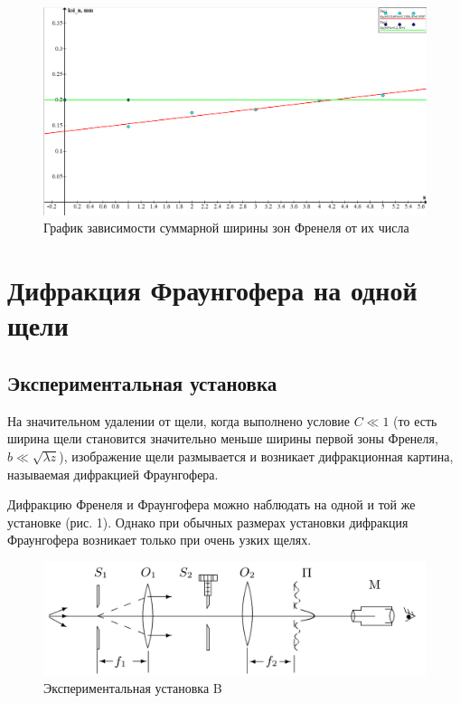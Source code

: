 \begin{figure}[h!]
	\label{graf_a}
	\includegraphics[scale=0.47]{pics/graph1.png}
	\caption{График зависимости суммарной ширины зон Френеля от их числа}
\end{figure}



\section{Дифракция Фраунгофера на одной щели}

	\subsection{Экспериментальная установка}
	
	На значительном удалении от щели, когда выполнено условие $ C \ll 1 $
(то есть ширина щели становится значительно меньше ширины первой
зоны Френеля, $ b \ll \sqrt{\lambda z} $), изображение щели размывается и возникает
дифракционная картина, называемая дифракцией Фраунгофера.

Дифракцию Френеля и Фраунгофера можно наблюдать на одной
и той же установке (рис. 1). Однако при обычных размерах установки дифракция Фраунгофера возникает только при очень узких щелях.

	\begin{figure}[h!]
		\centering
		\includegraphics[width=0.8\linewidth]{pics/b.png}
		\caption{Экспериментальная установка B}
		\label{labB}
	\end{figure}

